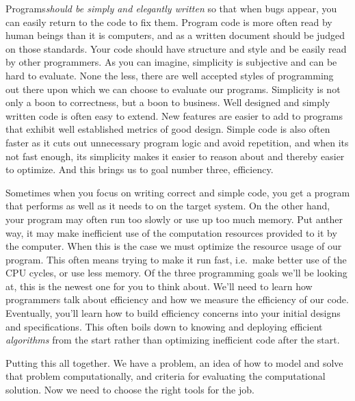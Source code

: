 \documentclass[nobib]{tufte-handout}
\begin{document}
Programs\textit{should be simply and elegantly written} so that when bugs appear, you can easily return to the code to fix them.  Program code is more often read by human beings than it is computers, and as a written document should be judged on those standards.  Your code should have structure and style and be easily read by other programmers.  As you can imagine, simplicity is subjective and can be hard to evaluate.  None the less, there are well accepted styles of programming out there upon which we can choose to evaluate our programs. Simplicity is not only a boon to correctness, but a boon to business. Well designed and simply written code is often easy to extend. New features are easier to add to programs that exhibit well established metrics of good design. Simple code is also often faster as it cuts out unnecessary program logic and avoid repetition, and when its not fast enough, its simplicity makes it easier to reason about and thereby easier to optimize. And this brings us to goal number three, efficiency.

Sometimes when you focus on writing correct and simple code, you get a program that performs as well as it needs to on the target system. On the other hand, your program may often run too slowly or use up too much memory. Put anther way, it may make inefficient use of the computation resources provided to it by the computer.  When this is the case we must optimize the resource usage of our program.  This often means trying to make it run fast, i.e.\ make better use of the CPU cycles, or use less memory.  Of the three programming goals we'll be looking at, this is the newest one for you to think about.  We'll need to learn how programmers talk about efficiency and how we measure the efficiency of our code. Eventually, you'll learn how to build efficiency concerns into your initial designs and specifications. This often boils down to knowing and deploying efficient \textit{algorithms} from the start rather than optimizing inefficient code after the start.

Putting this all together. We have a problem, an idea of how to model and solve that problem computationally, and criteria for evaluating the computational solution. Now we need to choose the right tools for the job.
\end{document}
